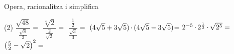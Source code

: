 \begin{mylist}
\exer[1] Opera, racionalitza i simplifica
\begin{tasks}(2)
	\task $\dfrac{\sqrt{48} }{\frac{\sqrt{8} }{3} } =$  
	\task $\dfrac{\sqrt[{4}]{2} }{\frac{2}{\sqrt{2} } } =$ 
	\task $\dfrac{\frac{1}{2} }{\frac{\sqrt{3} }{3} } =$        
	\task  ${\rm (4}\sqrt{{\rm 5}} +{\rm 3}\sqrt{{\rm 5}} {\rm )}\, {\rm \cdot }\, {\rm (4}\sqrt{{\rm 5}} -{\rm 3}\sqrt{{\rm 5}} {\rm )}$=  
	\task ${\rm 2}^{-{\rm 5}} \, {\rm \cdot }\, {\rm 2}^{\frac{{\rm 1}}{{\rm 3}} } \, {\rm \cdot }\, \sqrt{{\rm 2}^{{\rm 5}} } =$
	\task $\left(\frac{{\rm 5}}{{\rm 2}} -\sqrt{{\rm 2}} \right)^{{\rm 2}} =$ 
\end{tasks}

\end{mylist}

\pagebreak







